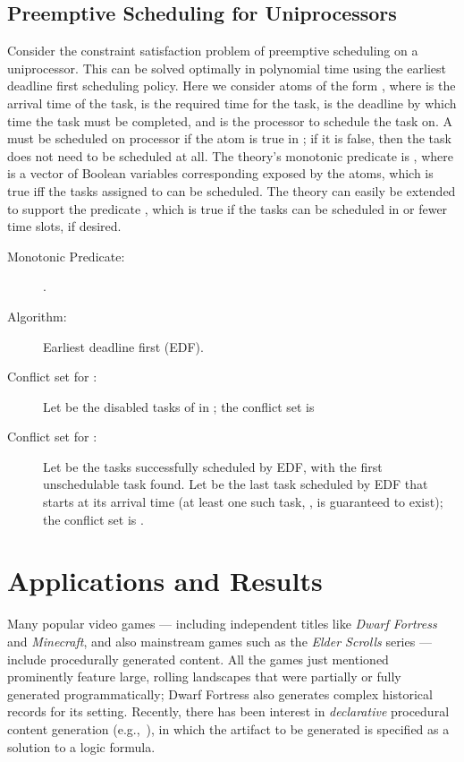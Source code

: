 \documentclass[runningheads]{llncs}
\begin{document}
\subsection{{Preemptive Scheduling for Uniprocessors}}
Consider the constraint satisfaction problem of preemptive scheduling on a uniprocessor. This can be solved optimally in polynomial time using the earliest deadline first scheduling policy\cite{liu1973scheduling}. Here we consider atoms of the form , where  is the arrival time of the task,  is the required time for the task,  is the deadline by which time the task must be completed, and  is the processor to schedule the task on. A  must be scheduled on processor  if the atom is true in ; if it is false, then the task does not need to be scheduled at all. The theory's monotonic predicate is , where  is a vector of Boolean variables corresponding exposed by the  atoms, which is true iff the tasks assigned to  can be scheduled. The theory can easily be extended to support the predicate , which is true if the tasks can be scheduled in  or fewer time slots, if desired. 



\begin{description}
\item[Monotonic Predicate:] .
\item[Algorithm:] Earliest deadline first (EDF).
\item[Conflict set for :] Let  be the disabled tasks of  in ; the conflict set is 
\item[Conflict set for :] Let  be the tasks successfully scheduled by EDF, with  the first unschedulable task found. 
Let  be the last task scheduled by EDF that starts at its arrival time (at least one such task, , is guaranteed to exist); the conflict set is .


\end{description}




\section{Applications and Results \label{sec:graph}}

Many popular video games --- including independent titles like \textit{Dwarf Fortress} and \textit{Minecraft}, and also mainstream games such as the\textit{ Elder Scrolls} series --- include procedurally generated content. All the games just mentioned prominently feature large, rolling landscapes that were partially or fully generated programmatically; Dwarf Fortress also generates complex historical records for its setting. Recently, there has been interest in \textit{declarative} procedural content generation (e.g.,~\cite{boenn2008automatic,smith2011answer}), in which the artifact to be generated is specified as a solution to a logic formula.
\end{document}
